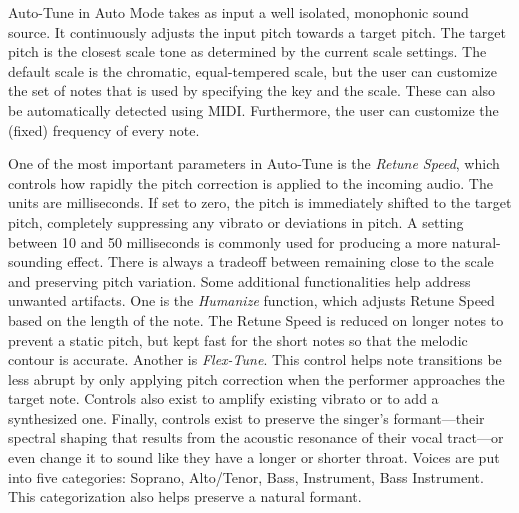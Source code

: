 Auto-Tune in Auto Mode takes as input a well isolated, monophonic sound source. It continuously adjusts the input pitch towards a target pitch. The target pitch is the closest scale tone as determined by the current scale settings. The default scale is the chromatic, equal-tempered scale, but the user can customize the set of notes that is used by specifying the key and the scale. These can also be automatically detected using MIDI. Furthermore, the user can customize the (fixed) frequency of every note.

One of the most important parameters in Auto-Tune is the \textit{Retune Speed}, which controls how rapidly the pitch correction is applied to the incoming audio. The units are milliseconds. If set to zero, the pitch is immediately shifted to the target pitch, completely suppressing any vibrato or deviations in pitch. A setting between 10 and 50 milliseconds is commonly used for producing a more natural-sounding effect. There is always a tradeoff between remaining close to the scale and preserving pitch variation. Some additional functionalities help address unwanted artifacts. One is the \textit{Humanize} function, which adjusts Retune Speed based on the length of the note. The Retune Speed is reduced on longer notes to prevent a static pitch, but kept fast for the short notes so that the melodic contour is accurate. Another is \textit{Flex-Tune}. This control helps note transitions be less abrupt by only applying pitch correction when the performer approaches the target note. Controls also exist to amplify existing vibrato or to add a synthesized one. Finally, controls exist to preserve the singer's formant---their spectral shaping that results from the acoustic resonance of their vocal tract---or even change it to sound like they have a longer or shorter throat. Voices are put into five categories: Soprano, Alto/Tenor, Bass, Instrument, Bass Instrument. This categorization also helps preserve a natural formant. 

